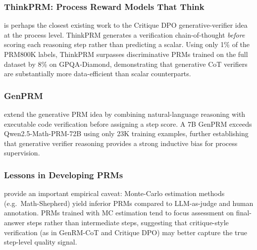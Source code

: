 

\subsubsection{ThinkPRM: Process Reward Models That Think}

\autocite{khalifa2025thinkprmprocessrewardmodels} is perhaps the
closest existing work to the Critique DPO generative-verifier idea at
the process level.  ThinkPRM generates a verification
chain-of-thought \emph{before} scoring each reasoning step rather
than predicting a scalar.  Using only 1\% of the PRM800K labels,
ThinkPRM surpasses discriminative PRMs trained on the full dataset by
8\% on GPQA-Diamond, demonstrating that generative CoT verifiers are
substantially more data-efficient than scalar counterparts.

\subsubsection{GenPRM}

\autocite{zhao2025genprm} extend the generative PRM idea by combining
natural-language reasoning with executable code verification before
assigning a step score.  A 7B GenPRM exceeds Qwen2.5-Math-PRM-72B
using only 23K training examples, further establishing that
generative verifier reasoning provides a strong inductive bias for
process supervision.

\subsubsection{Lessons in Developing PRMs}

\autocite{zhang2025lessonsdevelopingprocessreward} provide an
important empirical caveat: Monte-Carlo estimation methods (e.g.\
Math-Shepherd) yield inferior PRMs compared to LLM-as-judge and
human annotation.  PRMs trained with MC estimation tend to focus
assessment on final-answer steps rather than intermediate steps,
suggesting that critique-style verification (as in GenRM-CoT and
Critique DPO) may better capture the true step-level quality signal.

